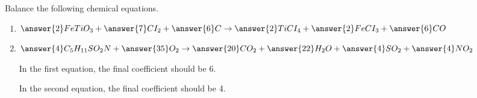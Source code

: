\documentclass{ximera}
\author{Zack Reed}
\begin{document}
\begin{problem}

Balance the following chemical equations. 

\begin{enumerate}

\item $\answer{2} FeTiO_3+\answer{7} CI_2+\answer{6} C\rightarrow \answer{2} TiCI_4+\answer{2} FeCI_3+\answer{6} CO$
    
    
\item $\answer{4} C_5H_{11} SO_2N+\answer{35} O_2\rightarrow \answer{20} CO_2+\answer{22} H_2O+\answer{4} SO_2+\answer{4} NO_2$

In the first equation, the final coefficient should be 6. 

In the second equation, the final coefficient should be 4.

\end{enumerate}

\end{problem}
\end{document}
